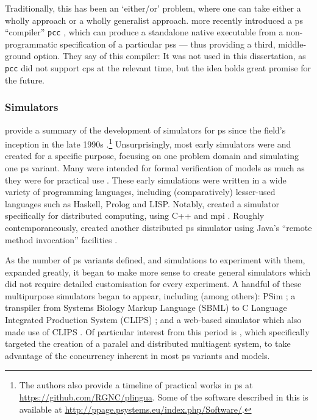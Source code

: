 Traditionally, this has been an `either/or' problem, where one can take either a wholly \adhoc{} approach or a wholly generalist approach.  \citeauthor{Perez-Hurtado2019} more recently introduced a \gls{ps} ``compiler'' \texttt{pcc} \cite{Perez-Hurtado2019}, which can produce a standalone native executable from a non-programmatic specification of a particular \glspl{ps} --- thus providing a third, middle-ground option.  They say of this compiler:   It was not used in this dissertation, as \texttt{pcc} did not support \gls{cps} at the relevant time, but the idea holds great promise for the future.


\subsubsection{\label{sec:back:simulators} Simulators}

\citeauthor{Valencia-Cabrera2019} provide a summary of the development of simulators for \Gls{ps} since the field's inception in the late 1990s \cite{Valencia-Cabrera2019}.\footnote{The authors also provide a timeline of practical works in \gls{ps} at \url{https://github.com/RGNC/plingua}.  Some of the software described in this  is available at \url{http://ppage.psystems.eu/index.php/Software/}.}  Unsurprisingly, most early simulators were \adhoc{} and created for a specific purpose, focusing on one problem domain and simulating one \gls{ps} variant.  Many were intended for formal verification of models as much as they were for practical use \cite{Gutierrez-Naranjo2007}.  These early simulations were written in a wide variety of programming languages, including (comparatively) lesser-used languages such as Haskell, Prolog and LISP.  Notably, \citeauthor{Ciobanu2004} created a simulator specifically for distributed computing, using C++ and \gls{mpi} \cite{Ciobanu2004}.  Roughly contemporaneously, \citeauthor{Syropoulos2004} created another distributed \gls{ps} simulator using Java's ``remote method invocation'' facilities \cite{Syropoulos2004}.

As the number of \gls{ps} variants defined, and simulations to experiment with them, expanded greatly, it began to make more sense to create general simulators which did not require detailed customisation for every experiment.  A handful of these multipurpose simulators began to appear, including (among others): PSim \cite{Bianco2007,Bianco2007a}; a transpiler from Systems Biology Markup Language (SBML) to C Language Integrated Production System (CLIPS) \cite{NepomucenoChamorro2005};  and a web-based simulator which also made use of CLIPS \cite{Bonchis2005}.  Of particular interest from this period is \cite{Acampora2007}, which specifically targeted the creation of a paralel and distributed multiagent system, to take advantage of the concurrency inherent in most \gls{ps} variants and models.

